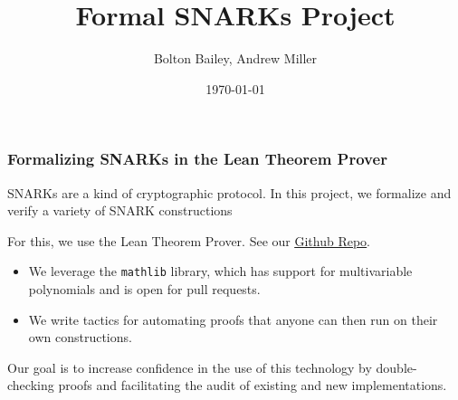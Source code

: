 \documentclass{beamer}
\title[Formal SNARKs Project]{Formal SNARKs Project} %
\author{Bolton Bailey, Andrew Miller} %
\institute[UIUC] %
{
University of Illinois Urbana-Champaign \\ %
\medskip
\textit{boltonb2@illinois.edu} %
}
\date{\today} %
\begin{document}
\begin{frame}
\titlepage %
\end{frame}



    

    




\begin{frame}
    \frametitle{Formalizing SNARKs in the Lean Theorem Prover}

    SNARKs are a kind of cryptographic protocol. In this project, we formalize and verify a variety of SNARK constructions

    \vspace{0.5cm}
    
    For this, we use the Lean Theorem Prover. See our \underline{\href{https://github.com/BoltonBailey/formal_baby_snark}{Github Repo}}. %

    \begin{itemize}
        \item We leverage the \texttt{mathlib} library, which has support for multivariable polynomials and is open for pull requests. 
        \item We write tactics for automating proofs that anyone can then run on their own constructions.
    \end{itemize}

    Our goal is to increase confidence in the use of this technology by double-checking proofs and facilitating the audit of existing and new implementations.

\end{frame}
\end{document}

